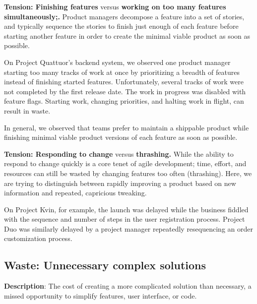 \textbf{Tension: Finishing features} versus \textbf{working on too many features simultaneously;.}
Product managers decompose a feature into a set of stories, and typically sequence the stories to finish just enough of each feature before starting another feature in order to create the minimal viable product as soon as possible. 

On Project Quattuor's backend system, we observed one product manager starting too many tracks of work at once by prioritizing a breadth of features instead of finishing started features. Unfortunately, several tracks of work were not completed by the first release date. The work in progress was disabled with feature flags. Starting work, changing priorities, and halting work in flight, can result in waste.

In general, we observed that teams prefer to maintain a shippable product while finishing minimal viable product versions of each feature as soon as possible. 

\textbf{Tension: Responding to change} versus \textbf{thrashing.}
While the ability to respond to change quickly is a core tenet of agile development; time, effort, and resources can still be wasted by changing features too often (thrashing). Here, we are trying to distinguish between rapidly improving a product based on new information and repeated, capricious tweaking. 

On Project Kvin, for example, the launch was delayed while the business fiddled with the sequence and number of steps in the user registration process. Project Duo was similarly delayed by a project manager repeatedly resequencing an order customization process. 



\subsection{Waste: Unnecessary complex solutions}
\textbf{Description}: The cost of creating a more complicated solution than necessary, a missed opportunity to simplify features, user interface, or code.


